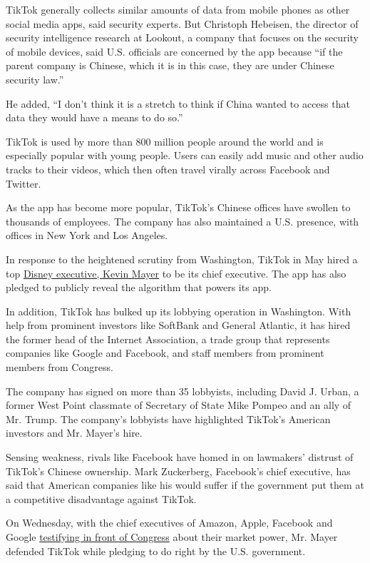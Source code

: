 TikTok generally collects similar amounts of data from mobile phones as
other social media apps, said security experts. But Christoph Hebeisen,
the director of security intelligence research at Lookout, a company
that focuses on the security of mobile devices, said U.S. officials are
concerned by the app because ``if the parent company is Chinese, which
it is in this case, they are under Chinese security law.''

He added, ``I don't think it is a stretch to think if China wanted to
access that data they would have a means to do so.''

TikTok is used by more than 800 million people around the world and is
especially popular with young people. Users can easily add music and
other audio tracks to their videos, which then often travel virally
across Facebook and Twitter.

As the app has become more popular, TikTok's Chinese offices have
swollen to thousands of employees. The company has also maintained a
U.S. presence, with offices in New York and Los Angeles.

In response to the heightened scrutiny from Washington, TikTok in May
hired a top
\href{https://www.nytimes3xbfgragh.onion/2020/05/18/business/media/tiktok-ceo-kevin-mayer.html}{Disney
executive, Kevin Mayer} to be its chief executive. The app has also
pledged to publicly reveal the algorithm that powers its app.

In addition, TikTok has bulked up its lobbying operation in Washington.
With help from prominent investors like SoftBank and General Atlantic,
it has hired the former head of the Internet Association, a trade group
that represents companies like Google and Facebook, and staff members
from prominent members from Congress.

The company has signed on more than 35 lobbyists, including David J.
Urban, a former West Point classmate of Secretary of State Mike Pompeo
and an ally of Mr. Trump. The company's lobbyists have highlighted
TikTok's American investors and Mr. Mayer's hire.

Sensing weakness, rivals like Facebook have homed in on lawmakers'
distrust of TikTok's Chinese ownership. Mark Zuckerberg, Facebook's
chief executive, has said that American companies like his would suffer
if the government put them at a competitive disadvantage against TikTok.

On Wednesday, with the chief executives of Amazon, Apple, Facebook and
Google
\href{https://www.nytimes3xbfgragh.onion/2020/07/29/technology/big-tech-hearing-apple-amazon-facebook-google.html}{testifying
in front of Congress} about their market power, Mr. Mayer defended
TikTok while pledging to do right by the U.S. government.

